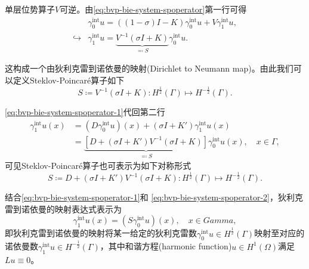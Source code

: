 单层位势算子$V$可逆。由\eqref{eq:bvp-bie-system-spoperator}第一行可得
\begin{equation}
  \label{eq:bvp-bie-system-spoperator-1}
\begin{split}
    & \gamma_{0}^{\text{int}} u = \left( \left( 1- \sigma \right) I - K \right) \gamma_{0}^{\text{int}} u + V \gamma_{1}^{\text{int}} u, \\
    \hookrightarrow & \gamma_{1}^{\text{int}} u = \underbrace{
    V^{-1} \left( \sigma I + K \right)
    }_{\eqqcolon S} \gamma_{0}^{\text{int}} u.
\end{split}
\end{equation}

这构成一个由狄利克雷到诺依曼的映射(Dirichlet to Neumann map)\citep{Behrndt:2015kq}。由此我们可以定义Steklov-Poincaré算子如下
\begin{equation}
  \label{eq:bvp-bie-system-spoperator-def}
  S \coloneqq V^{-1} \left( \sigma I + K \right) : H^{\frac{1}{2}}(\Gamma) \mapsto H^{-\frac{1}{2}}(\Gamma).
\end{equation}

\eqref{eq:bvp-bie-system-spoperator-1}代回第二行
\begin{equation}
  \label{eq:bvp-bie-system-spoperator-2}
  \begin{split}
    \gamma_{1}^{\text{int}} u(x) &=
    \left( D \gamma_{0}^{\text{int}} u \right)(x)
    + \left( \sigma I + K' \right) \gamma_{1}^{\text{int}} u(x) \\
    & = \underbrace{
    \left[
    D + \left( \sigma I + K' \right) V^{-1} \left( \sigma I + K \right)
    \right]
    }_{\eqqcolon S}
    \gamma_{0}^{\text{int}} u(x), \quad x \in \Gamma,
  \end{split}
\end{equation}
可见Steklov-Poincaré算子也可表示为如下对称形式
\begin{equation}
    \label{eq:bvp-bie-system-spoperator-def-sym}
    S \coloneqq     D + \left( \sigma I + K' \right) V^{-1} \left( \sigma I + K \right) : H^{\frac{1}{2}}(\Gamma) \mapsto H^{-\frac{1}{2}}(\Gamma).
\end{equation}

结合\eqref{eq:bvp-bie-system-spoperator-1}和  \eqref{eq:bvp-bie-system-spoperator-2}，狄利克雷到诺依曼的映射表达式表示为
\begin{equation}
  \gamma_{1}^{\text{int}} u(x) = \left( S \gamma_{0}^{\text{int}} u \right)(x), \quad x \in Gamma,
\end{equation}
即狄利克雷到诺依曼的映射将某一给定的狄利克雷数$\gamma_{0}^{\text{int}} u \in H^{\frac{1}{2}}(\Gamma)$映射至对应的诺依曼数$\gamma_{1}^{\text{int}} u \in H^{-\frac{1}{2}}(\Gamma)$，其中和谐方程(harmonic function)$u \in H^{1}(\Omega)$满足$L u \equiv 0$。

